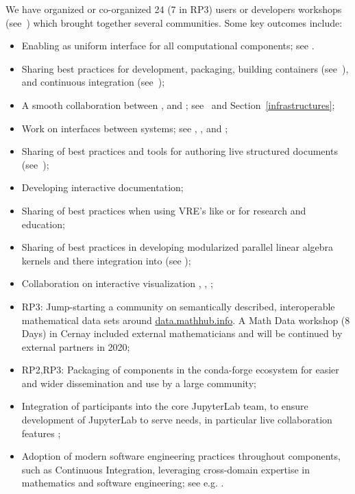 \begin{compactenum}[\bf {Obj} 1\rm]
  We have organized or co-organized 24 (7 in RP3) users or developers
  workshops (see~) which brought
  together several communities. Some key outcomes include:
  \begin{itemize}
  \item Enabling \Jupyter as uniform interface for all computational components; see .
  \item Sharing best practices for development, packaging, building containers (see~), and continuous integration (see~);
  \item A smooth collaboration between \JupyterHub, and \Simulagora; see~ and Section~\ref{infrastructures};
  \item Work on interfaces between systems; see , , and ;
  \item Sharing of best practices and tools for authoring live structured documents (see~);
  \item Developing interactive documentation;
  \item Sharing of best practices when using VRE's like \cocalc or \Jupyter for research and education;
  \item Sharing of best practices in developing modularized parallel linear algebra kernels and there integration into \SageMath (see );
  \item Collaboration on interactive visualization , , ;
  \item RP3: Jump-starting a community on semantically described, interoperable mathematical data sets around \url{data.mathhub.info}. A Math Data workshop (8 Days) in Cernay included external mathematicians and will be continued by external partners in 2020;
  \item RP2,RP3: Packaging of \ODK components in the conda-forge ecosystem
  for easier and wider dissemination and use by a large community;
  \item Integration of \ODK participants into the core JupyterLab team,
  to ensure development of JupyterLab to serve \ODK needs,
  in particular live collaboration features ;
  \item Adoption of modern software engineering practices throughout \ODK components,
  such as Continuous Integration,
  leveraging cross-domain expertise
  in mathematics and software engineering;
  see e.g. .
  \end{itemize}


\end{compactenum}
